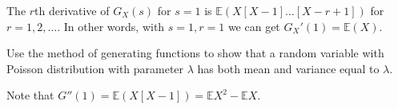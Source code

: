\begin{theorem}
	The \( r \)th derivative of \( G_X(s) \) for \( s=1 \) is \( \mathbb{E}(X[X-1]\ldots [X-r+1]) \) for \( r = 1,2,\ldots  \). In other words, with \( s=1, r=1 \) we can get \( G_X'(1) = \mathbb{E}(X) \).
\end{theorem}

\begin{eg}
	Use the method of generating functions to show that a random variable with Poisson distribution with parameter \( \lambda  \) has both mean and variance equal to \( \lambda  \).
\end{eg}
\begin{explanation}
	Note that \( G''(1) = \mathbb{E}(X[X-1]) = \mathbb{E}X^{2} - \mathbb{E}X \).
\end{explanation}
